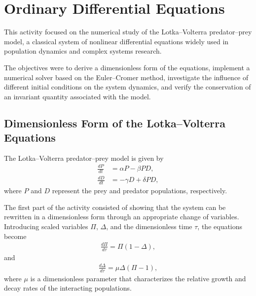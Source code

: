 \documentclass[../portafolio.tex]{subfiles}
\begin{document}
\section{Ordinary Differential Equations}   %


\medskip
This activity focused on the numerical study of the Lotka--Volterra predator--prey model, a classical system of nonlinear differential equations widely used in population dynamics and complex systems research.

The objectives were to derive a dimensionless form of the equations, implement a numerical solver based on the Euler--Cromer method, investigate the influence of different initial conditions on the system dynamics, and verify the conservation of an invariant quantity associated with the model.


\subsection{Dimensionless Form of the Lotka--Volterra Equations}

The Lotka--Volterra predator--prey model is given by
\begin{align}
\frac{dP}{dt} &= \alpha P - \beta PD, \nonumber \\
\frac{dD}{dt} &= -\gamma D + \delta PD,
\label{eclv}
\end{align}
where $P$ and $D$ represent the prey and predator populations, respectively.

The first part of the activity consisted of showing that the system can be rewritten in a dimensionless form through an appropriate change of variables. Introducing scaled variables $\Pi$, $\Delta$, and the dimensionless time $\tau$, the equations become
\begin{align}
\frac{d\Pi}{d\tau} = \Pi(1-\Delta),
\label{ec1}
\end{align}
and
\begin{align}
\frac{d\Delta}{d\tau} = \mu\Delta(\Pi-1),
\label{ec2}
\end{align}
where $\mu$ is a dimensionless parameter that characterizes the relative growth and decay rates of the interacting populations.
\end{document}
